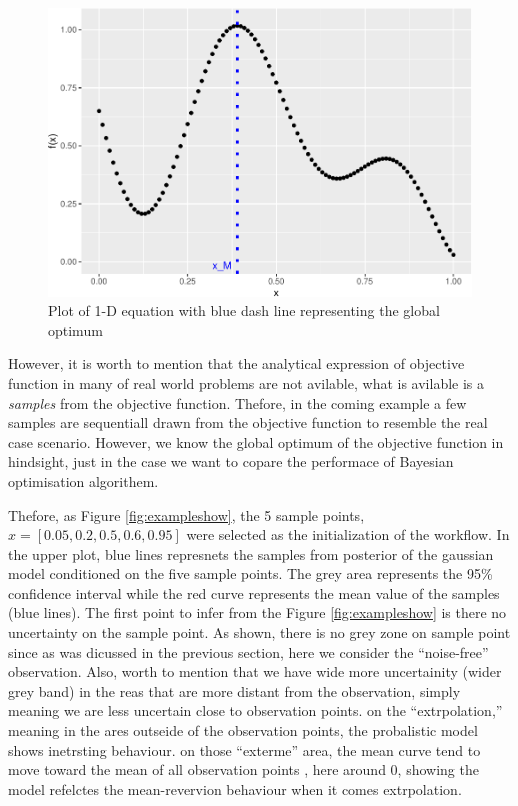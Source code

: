\documentclass[]{elsarticle} %
\begin{document}
\begin{figure}

{\centering \includegraphics[width=0.9\linewidth]{0_Paper1_main_files/figure-latex/onedplot-1} 

}

\caption{Plot of 1-D equation with blue dash line representing the global optimum}\label{fig:onedplot}
\end{figure}

However, it is worth to mention that the analytical expression of objective function in many of real world problems are not avilable, what is avilable is a \emph{samples} from the objective function. Thefore, in the coming example a few samples are sequentiall drawn from the objective function to resemble the real case scenario. However, we know the global optimum of the objective function in hindsight, just in the case we want to copare the performace of Bayesian optimisation algorithem.

Thefore, as Figure \ref{fig:exampleshow}, the 5 sample points, \(x=[0.05,0.2,0.5,0.6,0.95]\) were selected as the initialization of the workflow. In the upper plot, blue lines represnets the samples from posterior of the gaussian model conditioned on the five sample points. The grey area represents the 95\% confidence interval while the red curve represents the mean value of the samples (blue lines). The first point to infer from the Figure \ref{fig:exampleshow} is there no uncertainty on the sample point. As shown, there is no grey zone on sample point since as was dicussed in the previous section, here we consider the ``noise-free'' observation. Also, worth to mention that we have wide more uncertainity (wider grey band) in the reas that are more distant from the observation, simply meaning we are less uncertain close to observation points. on the ``extrpolation,'' meaning in the ares outseide of the observation points, the probalistic model shows inetrsting behaviour. on those ``exterme'' area, the mean curve tend to move toward the mean of all observation points , here around 0, showing the model refelctes the mean-revervion behaviour when it comes extrpolation.
\end{document}
